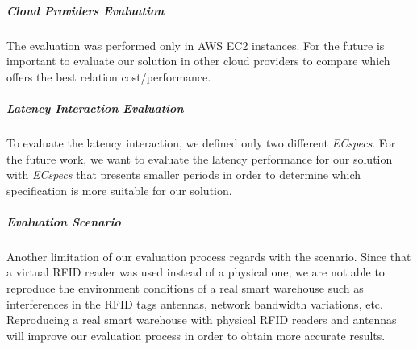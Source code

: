 \subparagraph{Cloud Providers Evaluation}
\label{subp:cloud_eval}
The evaluation was performed only in \gls{AWS} \gls{EC2} instances. For the future is important to
evaluate our solution in other cloud providers to compare which offers the best relation
cost/performance.\\

\subparagraph{Latency Interaction Evaluation}
\label{subp:latency_eval}
To evaluate the latency interaction, we defined only two different \textit{ECspecs}. For the future work,
we want to evaluate the latency performance for our solution with \textit{ECspecs} that presents smaller
periods in order to determine which specification is more suitable for our solution.\\

\subparagraph{Evaluation Scenario}
\label{subp:scenario_eval}
Another limitation of our evaluation process regards with the scenario. Since that a virtual \gls{RFID}
reader was used instead of a physical one, we are not able to reproduce the environment conditions
of a real smart warehouse such as interferences in the \gls{RFID} tags antennas, network bandwidth
variations, etc. Reproducing a real smart warehouse with physical \gls{RFID} readers and antennas
will improve our evaluation process in order to obtain more accurate results.
